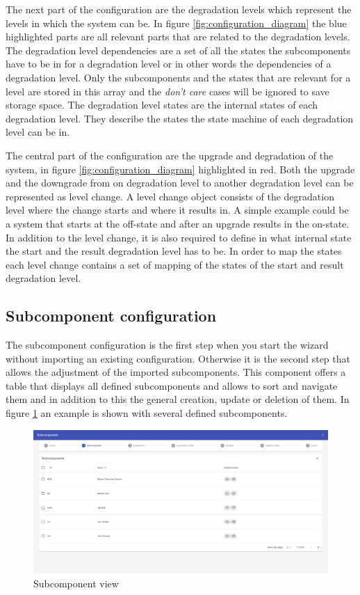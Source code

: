 The next part of the configuration are the degradation levels which represent the levels in which the system can be. In figure \ref{fig:configuration_diagram} the blue highlighted parts are all relevant parts that are related to the degradation levels. The degradation level dependencies are a set of all the states the subcomponents have to be in for a degradation level or in other words the dependencies of a degradation level. Only the subcomponents and the states that are relevant for a level are stored in this array and the \textit{don't care} cases will be ignored to save storage space. The degradation level states are the internal states of each degradation level. They describe the states the state machine of each degradation level can be in.

The central part of the configuration are the upgrade and degradation of the system, in figure \ref{fig:configuration_diagram} highlighted in red. Both the upgrade and the downgrade from on degradation level to another degradation level can be represented as level change. A level change object consists of the degradation level where the change starts and where it results in. A simple example could be a system that starts at the off-state and after an upgrade results in the on-state. In addition to the level change, it is also required to define in what internal state the start and the result degradation level has to be. In order to map the states each level change contains a set of mapping of the states of the start and result degradation level.


\subsection{Subcomponent configuration}

The subcomponent configuration is the first step when you start the wizard without importing an existing configuration. Otherwise it is the second step that allows the adjustment of the imported subcomponents.
This component offers a table that displays all defined subcomponents and allows to sort and navigate them and in addition to this the general creation, update or deletion of them. In figure \ref{fig:subcomponent_view} an example is shown with several defined subcomponents.

\begin{figure}[ht]
    \centering
    \includegraphics[width=\textwidth]{img/subcomponents_overview.png}
    \caption{Subcomponent view}
    \label{fig:subcomponent_view}
\end{figure}

